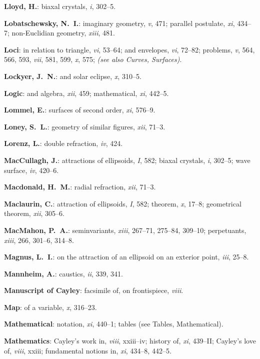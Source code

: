 \documentclass[11pt,a4paper]{article}
\newcommand{\IndexEntry}[1]{\textbf{#1}}
\newcommand{\SeeAlso}[1]{\textit{(see also #1)}}
\newcommand{\V}[1]{\textit{#1}} %
\begin{document}
\IndexEntry{Lloyd, H.}: biaxal crystals, \V{i}, 302--5.

\IndexEntry{Lobatschewsky, N.\ I.}: imaginary geometry, \V{v}, 471; parallel postulate, \V{xi}, 434--7; non-Euclidian geometry, \V{xiii}, 481.

\IndexEntry{Loci}: in relation to triangle, \V{vi}, 53--64; and envelopes, \V{vi}, 72--82; problems, \V{v}, 564, 566, 593, \V{vii}, 581, 599, \V{x}, 575; \SeeAlso{Curves, Surfaces}.

\IndexEntry{Lockyer, J.\ N.}: and solar eclipse, \V{x}, 310--5.

\IndexEntry{Logic}: and algebra, \V{xii}, 459; mathematical, \V{xi}, 442--5.

\IndexEntry{Lommel, E.}: surfaces of second order, \V{xi}, 576--9.

\IndexEntry{Loney, S.\ L.}: geometry of similar figures, \V{xii}, 71--3.

\IndexEntry{Lorenz, L.}: double refraction, \V{iv}, 424.

\IndexEntry{MacCullagh, J.}: attractions of ellipsoids, \V{I}, 582; biaxal crystals, \V{i}, 302--5; wave surface, \V{iv}, 420--6.

\IndexEntry{Macdonald, H.\ M.}: radial refraction, \V{xii}, 71--3.

\IndexEntry{Maclaurin, C.}: attraction of ellipsoids, \V{I}, 582; theorem, \V{x}, 17--8; geometrical theorem, \V{xii}, 305--6.

\IndexEntry{MacMahon, P.\ A.}: seminvariants, \V{xiii}, 267--71, 275--84, 309--10; perpetuants, \V{xiii}, 266, 301--6, 314--8.

\IndexEntry{Magnus, L.\ I.}: on the attraction of an ellipsoid on an exterior point, \V{iii}, 25--8.

\IndexEntry{Mannheim, A.}: caustics, \V{ii}, 339, 341.

\newpage

\setcounter{page}{111}

\IndexEntry{Manuscript of Cayley}: facsimile of, on frontispiece, \V{viii}.

\IndexEntry{Map}: of a variable, \V{x}, 316--23.

\IndexEntry{Mathematical}: notation, \V{xi}, 440--1; tables (see Tables, Mathematical).

\IndexEntry{Mathematics}: Cayley's work in, \V{viii}, xxiii--iv; history of, \V{xi}, 439--II; Cayley's love of, \V{viii}, xxiii; fundamental notions in, \V{xi}, 434--8, 442--5.
\end{document}

